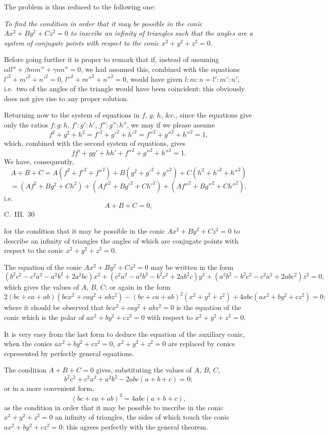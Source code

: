 \documentclass[11pt,a4paper]{book}
\begin{document}
The problem is thus reduced to the following one:

\textit{To find the condition in order that it may be possible in the conic $Ax^2 + By^2 + Cz^2 = 0$ to inscribe an infinity of triangles such that the angles are a system of conjugate points with respect to the conic $x^2 + y^2 + z^2 = 0$.}

Before going further it is proper to remark that if, instead of assuming $\alpha ll'' + \beta mm'' + \gamma nn'' = 0$, we had assumed this, combined with the equations $l'^2 + m'^2 + n'^2 = 0$, $l''^2 + m''^2 + n''^2 = 0$, would have given $l:m:n = l':m':n'$, i.e.\ two of the angles of the triangle would have been coincident: this obviously does not give rise to any proper solution.

Returning now to the system of equations in $f$, $g$, $h$, \&c., since the equations give only the ratios $f:g:h$, $f':g':h'$, $f'':g'':h''$, we may if we please assume
\[
f^2 + g^2 + h^2 = f'^2 + g'^2 + h'^2 = f''^2 + g''^2 + h''^2 = 1,
\]
which, combined with the second system of equations, gives
\[
ff' + gg' + hh' + f''^2 + g''^2 + h''^2 = 1.
\]
We have, consequently,
\[
A + B + C = A(f^2 + f'^2 + f''^2) + B(g^2 + g'^2 + g''^2) + C(h^2 + h'^2 + h''^2)
\]
\[
= (Af^2 + Bg^2 + Ch^2) + (Af'^2 + Bg'^2 + Ch'^2) + (Af''^2 + Bg''^2 + Ch''^2),
\]
i.e.
\[
A + B + C = 0,
\]
\hfill C.~III.~30
\newpage

for the condition that it may be possible in the conic $Ax^2 + By^2 + Cz^2 = 0$ to describe an infinity of triangles the angles of which are conjugate points with respect to the conic $x^2 + y^2 + z^2 = 0$.

The equation of the conic $Ax^2 + By^2 + Cz^2 = 0$ may be written in the form
\[
(b^2c^2 - c^2a^2 - a^2b^2 + 2a^2bc)x^2 + (c^2a^2 - a^2b^2 - b^2c^2 + 2ab^2c)y^2 + (a^2b^2 - b^2c^2 - c^2a^2 + 2abc^2)z^2 = 0,
\]
which gives the values of $A$, $B$, $C$; or again in the form
\[
2(bc + ca + ab)(bcx^2 + cay^2 + abz^2) - (bc + ca + ab)^2(x^2 + y^2 + z^2) + 4abc(ax^2 + by^2 + cz^2) = 0;
\]
where it should be observed that $bcx^2 + cay^2 + abz^2 = 0$ is the equation of the conic which is the polar of $ax^2 + by^2 + cz^2 = 0$ with respect to $x^2 + y^2 + z^2 = 0$.

It is very easy from the last form to deduce the equation of the auxiliary conic, when the conics $ax^2 + by^2 + cz^2 = 0$, $x^2 + y^2 + z^2 = 0$ are replaced by conics represented by perfectly general equations.

The condition $A + B + C = 0$ gives, substituting the values of $A$, $B$, $C$,
\[
b^2c^2 + c^2a^2 + a^2b^2 - 2abc(a+b+c) = 0;
\]
or in a more convenient form,
\[
(bc + ca + ab)^2 = 4abc(a + b + c),
\]
as the condition in order that it may be possible to inscribe in the conic $x^2 + y^2 + z^2 = 0$ an infinity of triangles, the sides of which touch the conic $ax^2 + by^2 + cz^2 = 0$: this agrees perfectly with the general theorem.
\end{document}
